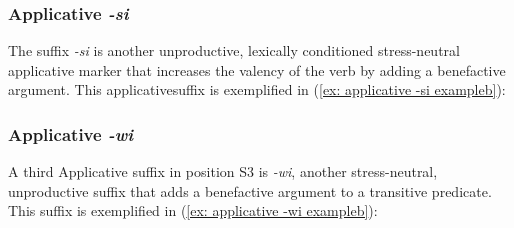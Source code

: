 \subsubsection{Applicative \textit{-si}}
\label{subsubsec: applicative si}

The suffix \textit{-si} is another unproductive, lexically conditioned stress-neutral applicative marker that increases the valency of the verb by adding a benefactive argument. This applicativesuffix is exemplified in (\ref{ex: applicative -si exampleb}):

\ea\label{ex: applicative -si example}

    \label{ex: applicative -si examplea}
        \label{ex: applicative -si exampleb}
    \z
\z

\largerpage
\subsubsection{Applicative \textit{-wi}}
\label{subsubsec: applicative wi}

A third Applicative suffix in position S3 is \textit{-wi}, another stress-neutral, unproductive suffix that adds a benefactive argument to a transitive predicate. This suffix is exemplified in (\ref{ex: applicative -wi exampleb}):

\ea\label{ex: applicative -wi example}

